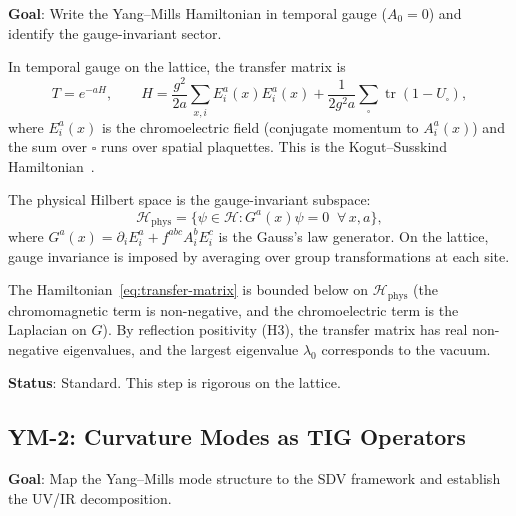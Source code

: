 \documentclass[11pt]{article}
\DeclareMathOperator{\tr}{tr}
\begin{document}
\textbf{Goal}: Write the Yang--Mills Hamiltonian in temporal gauge
($A_0 = 0$) and identify the gauge-invariant sector.

In temporal gauge on the lattice, the transfer matrix is
\begin{equation}\label{eq:transfer-matrix}
  T = e^{-aH}, \qquad
  H = \frac{g^2}{2a}\sum_{x,i} E_i^a(x) E_i^a(x)
  + \frac{1}{2g^2 a}\sum_{\square} \tr(1 - U_\square),
\end{equation}
where $E_i^a(x)$ is the chromoelectric field (conjugate momentum to
$A_i^a(x)$) and the sum over $\square$ runs over spatial plaquettes.
This is the Kogut--Susskind Hamiltonian~\cite{KS}.

The physical Hilbert space is the gauge-invariant subspace:
\begin{equation}\label{eq:gauss-law}
  \mathcal{H}_{\mathrm{phys}} =
  \bigl\{\psi \in \mathcal{H} : G^a(x)\psi = 0
  \;\;\forall\, x, a\bigr\},
\end{equation}
where $G^a(x) = \partial_i E_i^a + f^{abc} A_i^b E_i^c$ is the
Gauss's law generator.  On the lattice, gauge invariance is imposed by
averaging over group transformations at each site.

The Hamiltonian~\eqref{eq:transfer-matrix} is bounded below on
$\mathcal{H}_{\mathrm{phys}}$ (the chromomagnetic term is
non-negative, and the chromoelectric term is the Laplacian on $G$).
By reflection positivity (H3), the transfer matrix has real
non-negative eigenvalues, and the largest eigenvalue $\lambda_0$
corresponds to the vacuum.

\textbf{Status}: Standard.  This step is rigorous on the lattice.

\subsection{YM-2: Curvature Modes as TIG Operators}
\label{sec:ym2}

\textbf{Goal}: Map the Yang--Mills mode structure to the SDV
framework and establish the UV/IR decomposition.
\end{document}
